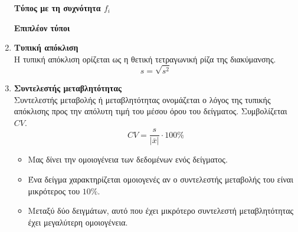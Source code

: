 \documentclass[twoside,nofonts,internet,math,spyros]{frontisthrio}
\begin{document}
\begin{arithmisi}
\begin{enumerate}[label=\bf\arabic*.,itemsep=0mm]
\textbf{Τύπος με τη συχνότητα $f_i$}
\textbf{Επιπλέον τύποι}
\item \textbf{Τυπική απόκλιση}\\
Η τυπική απόκλιση ορίζεται ως η θετική τετραγωνική ρίζα της διακύμανσης.
\[ s=\sqrt{s^2} \]
\item \textbf{Συντελεστής μεταβλητότητας}\\
Συντελεστής μεταβολής ή μεταβλητότητας ονομάζεται ο λόγος της τυπικής απόκλισης προς την απόλυτη τιμή του μέσου όρου του δείγματος. Συμβολίζεται $ CV $.
\[ CV=\frac{s}{|\overline{x}|}\cdot 100\% \]
\begin{itemize}
\item Μας δίνει την ομοιογένεια των δεδομένων ενός δείγματος.
\item Ένα δείγμα χαρακτηρίζεται ομοιογενές αν ο συντελεστής μεταβολής του είναι μικρότερος του $ 10\% $.
\item Μεταξύ δύο δειγμάτων, αυτό που έχει μικρότερο συντελεστή μεταβλητότητας έχει μεγαλύτερη ομοιογένεια.
\end{itemize}
\end{enumerate}
\end{arithmisi}
\end{document}
